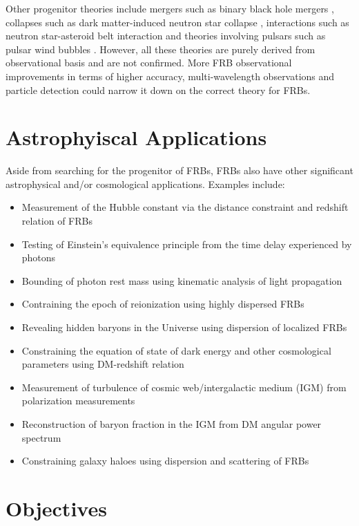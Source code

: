 Other progenitor theories include mergers such as binary black hole mergers \cite{Zhang2016}, collapses such as dark matter-induced neutron star collapse \cite{Totani2013}, interactions such as neutron star-asteroid belt interaction \cite{Dai2016} and theories involving pulsars such as pulsar wind bubbles \cite{Murase2016}. However, all these theories are purely derived from observational basis and are not confirmed. More FRB observational improvements in terms of higher accuracy, multi-wavelength observations and particle detection could narrow it down on the correct theory for FRBs. 

\section{Astrophyiscal Applications}

Aside from searching for the progenitor of FRBs, FRBs also have other significant astrophysical and/or cosmological applications. Examples include:
\begin{itemize}
    \item Measurement of the Hubble constant via the distance constraint and redshift relation of FRBs \cite{Steffen2021}
    \item Testing of Einstein's equivalence principle from the time delay experienced by photons \cite{Wei2015,Reischke2021}
    \item Bounding of photon rest mass using kinematic analysis of light propagation \cite{Wu2016,Wang2021}
    \item Contraining the epoch of reionization using highly dispersed FRBs \cite{Pagano2021}
    \item Revealing hidden baryons in the Universe using dispersion of localized FRBs \cite{Macquart2020}
    \item Constraining the equation of state of dark energy and other cosmological parameters using DM-redshift relation \cite{Zhou2014}
    \item Measurement of turbulence of cosmic web/intergalactic medium (IGM) from polarization measurements \cite{Ravi2016}
    \item Reconstruction of baryon fraction in the IGM from DM angular power spectrum \cite{Dai2021}
    \item Constraining galaxy haloes using dispersion and scattering of FRBs \cite{Ocker2021}
\end{itemize}

\section{Objectives}


